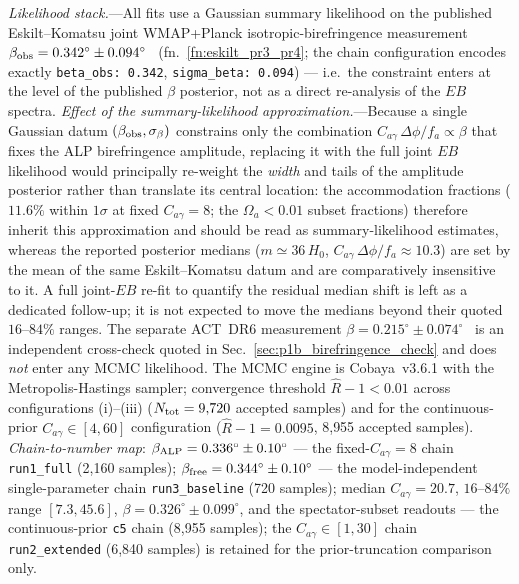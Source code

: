 \documentclass[aps,prd,twocolumn,superscriptaddress,showpacs,preprintnumbers,nofootinbib,longbibliography,floatfix]{revtex4-2}
\begin{document}
\textit{Likelihood stack.}---All fits use a Gaussian summary likelihood on
the published Eskilt--Komatsu joint WMAP+Planck isotropic-birefringence
measurement
$\beta_{\rm obs}=0.342^\circ\pm0.094^\circ$~\cite{Eskilt2022}
(fn.~\ref{fn:eskilt_pr3_pr4}; the chain configuration encodes exactly
\texttt{beta\_obs: 0.342}, \texttt{sigma\_beta: 0.094})
--- i.e.\ the constraint enters at the level of the published
$\beta$ posterior, not as a direct re-analysis of the $EB$ spectra.
\emph{Effect of the summary-likelihood approximation.}---Because a single
Gaussian datum $(\beta_{\rm obs},\sigma_\beta)$ constrains only the
combination $C_{a\gamma}\,\Delta\phi/f_a\propto\beta$ that fixes the ALP
birefringence amplitude, replacing it with the full joint $EB$ likelihood
would principally re-weight the \emph{width} and tails of the amplitude
posterior rather than translate its central location: the accommodation
fractions ($11.6\%$ within $1\sigma$ at fixed $C_{a\gamma}=8$; the
$\Omega_a<0.01$ subset fractions) therefore inherit this approximation and
should be read as summary-likelihood estimates, whereas the reported
posterior medians ($m\simeq36\,H_0$, $C_{a\gamma}\,\Delta\phi/f_a\approx10.3$)
are set by the mean of the same Eskilt--Komatsu datum and are comparatively
insensitive to it. A full joint-$EB$ re-fit to quantify the residual
median shift is left as a dedicated follow-up; it is not expected to move
the medians beyond their quoted $16$--$84\%$ ranges. The
separate ACT~DR6 measurement
$\beta=0.215^\circ\pm0.074^\circ$~\cite{DiegoPalazuelos2025} is an
independent cross-check quoted in Sec.~\ref{sec:p1b_birefringence_check} and
does \emph{not} enter any MCMC likelihood. The MCMC
engine is Cobaya~v3.6.1 with the Metropolis-Hastings sampler; convergence
threshold $\hat R - 1 < 0.01$ across configurations (i)--(iii)
($N_{\rm tot}=9{,}720$ accepted samples) and for the
continuous-prior $C_{a\gamma}\in[4,60]$ configuration ($\hat R-1=0.0095$,
8{,}955 accepted samples).
\textit{Chain-to-number map}: $\beta_{\rm ALP}=0.336^\circ\pm0.10^\circ$
--- the fixed-$C_{a\gamma}=8$ chain \texttt{run1\_full} (2{,}160
samples); $\beta_{\rm free}=0.344^\circ\pm0.10^\circ$ --- the
model-independent single-parameter chain \texttt{run3\_baseline} (720
samples); median $C_{a\gamma}=20.7$,
$16$--$84\%$ range $[7.3,45.6]$, $\beta=0.326^\circ\pm0.099^\circ$, and the
spectator-subset readouts --- the continuous-prior \texttt{c5} chain
(8{,}955 samples); the $C_{a\gamma}\in[1,30]$ chain
\texttt{run2\_extended} (6{,}840 samples) is retained for the
prior-truncation comparison only.
\end{document}
